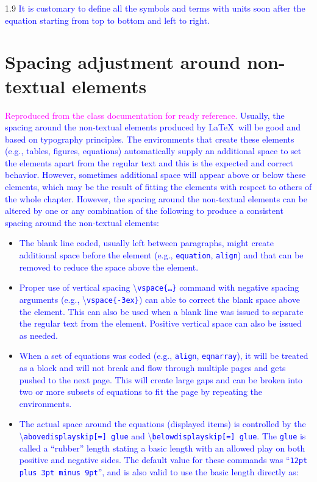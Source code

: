 \documentclass[phd]{ndsu-thesis-2022}
\newcommand\myspacing{1.9} %
\newcommand\italk[1]{\textcolor{blue}{#1}}  %
\newcommand\cmd[1]{\textbackslash\texttt{#1}}  %
\begin{document}
\begin{spacing}{\myspacing}
\italk{It is customary to define all the symbols and terms with units soon after the equation starting from top to bottom and left to right.}

\section{Spacing adjustment around non-textual elements}
\textcolor{magenta}{Reproduced from the class documentation	for ready reference.} \italk{Usually, the spacing around the non-textual elements produced by \LaTeX\ will be good and based on typography principles. The environments that create these elements (e.g., tables, figures, equations) automatically supply an additional space to set the elements apart from the regular text and this is the expected and correct behavior. However, sometimes additional space will appear above or below these elements, which may be the result of fitting the elements with respect to others of the whole chapter. However, the spacing around the non-textual elements can be altered by one or any combination of the following to produce a consistent spacing around the non-textual elements:}
\begin{itemize}
\item
\italk{The blank line coded, usually left between paragraphs, might create additional space before the element (e.g., \texttt{equation}, \texttt{align}) and that can be removed to reduce the space above the element.}
\item
\italk{Proper use of vertical spacing \cmd{vspace\{\ldots\}} command with negative spacing arguments (e.g., \cmd{vspace\{-3ex\}}) can able to correct the blank space above the element. This can also be used when a blank line was issued to separate the regular text from the element. Positive vertical space can also be issued as needed.}
\item
\italk{When a set of equations was coded (e.g., \texttt{align}, \texttt{eqnarray}), it will be treated as a block and will not break and flow through multiple pages and gets pushed to the next page. This will create large gaps and can be broken into two or more subsets of equations to fit the page by repeating the environments.}
\item
\italk{The actual space around the equations (displayed items) is controlled by the \\ \cmd{abovedisplayskip[=] glue} and \cmd{belowdisplayskip[=] glue}.
The \texttt{glue} is called a ``rubber'' length stating a basic length with an allowed play on both positive and negative sides. The default value for these commands was ``\texttt{12pt plus 3pt minus 9pt}'', and is also valid to use the basic length directly as:} 


\end{itemize}
\end{spacing}
\end{document}
